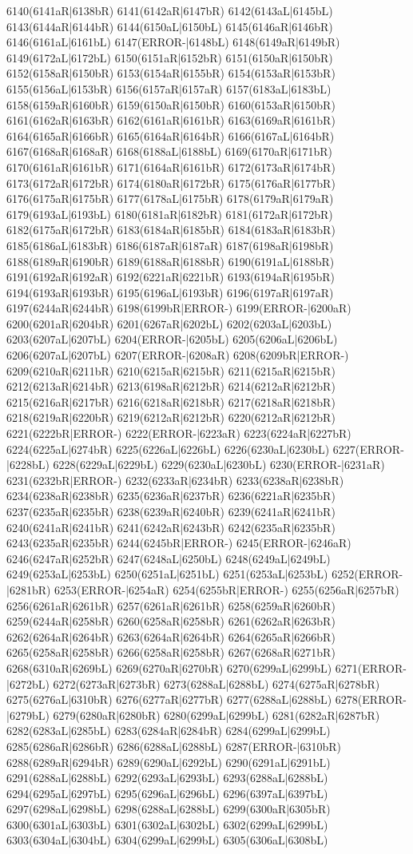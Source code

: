 6140(6141aR|6138bR) 6141(6142aR|6147bR) 6142(6143aL|6145bL) 6143(6144aR|6144bR) 6144(6150aL|6150bL) 6145(6146aR|6146bR) 6146(6161aL|6161bL) 6147(ERROR-|6148bL) 6148(6149aR|6149bR) 6149(6172aL|6172bL) 6150(6151aR|6152bR) 6151(6150aR|6150bR) 6152(6158aR|6150bR) 6153(6154aR|6155bR) 6154(6153aR|6153bR) 6155(6156aL|6153bR) 6156(6157aR|6157aR) 6157(6183aL|6183bL) 6158(6159aR|6160bR) 6159(6150aR|6150bR) 6160(6153aR|6150bR) 6161(6162aR|6163bR) 6162(6161aR|6161bR) 6163(6169aR|6161bR) 6164(6165aR|6166bR) 6165(6164aR|6164bR) 6166(6167aL|6164bR) 6167(6168aR|6168aR) 6168(6188aL|6188bL) 6169(6170aR|6171bR) 6170(6161aR|6161bR) 6171(6164aR|6161bR) 6172(6173aR|6174bR) 6173(6172aR|6172bR) 6174(6180aR|6172bR) 6175(6176aR|6177bR) 6176(6175aR|6175bR) 6177(6178aL|6175bR) 6178(6179aR|6179aR) 6179(6193aL|6193bL) 6180(6181aR|6182bR) 6181(6172aR|6172bR) 6182(6175aR|6172bR) 6183(6184aR|6185bR) 6184(6183aR|6183bR) 6185(6186aL|6183bR) 6186(6187aR|6187aR) 6187(6198aR|6198bR) 6188(6189aR|6190bR) 6189(6188aR|6188bR) 6190(6191aL|6188bR) 6191(6192aR|6192aR) 6192(6221aR|6221bR) 6193(6194aR|6195bR) 6194(6193aR|6193bR) 6195(6196aL|6193bR) 6196(6197aR|6197aR) 6197(6244aR|6244bR) 6198(6199bR|ERROR-) 6199(ERROR-|6200aR) 6200(6201aR|6204bR) 6201(6267aR|6202bL) 6202(6203aL|6203bL) 6203(6207aL|6207bL) 6204(ERROR-|6205bL) 6205(6206aL|6206bL) 6206(6207aL|6207bL) 6207(ERROR-|6208aR) 6208(6209bR|ERROR-) 6209(6210aR|6211bR) 6210(6215aR|6215bR) 6211(6215aR|6215bR) 6212(6213aR|6214bR) 6213(6198aR|6212bR) 6214(6212aR|6212bR) 6215(6216aR|6217bR) 6216(6218aR|6218bR) 6217(6218aR|6218bR) 6218(6219aR|6220bR) 6219(6212aR|6212bR) 6220(6212aR|6212bR) 6221(6222bR|ERROR-) 6222(ERROR-|6223aR) 6223(6224aR|6227bR) 6224(6225aL|6274bR) 6225(6226aL|6226bL) 6226(6230aL|6230bL) 6227(ERROR-|6228bL) 6228(6229aL|6229bL) 6229(6230aL|6230bL) 6230(ERROR-|6231aR) 6231(6232bR|ERROR-) 6232(6233aR|6234bR) 6233(6238aR|6238bR) 6234(6238aR|6238bR) 6235(6236aR|6237bR) 6236(6221aR|6235bR) 6237(6235aR|6235bR) 6238(6239aR|6240bR) 6239(6241aR|6241bR) 6240(6241aR|6241bR) 6241(6242aR|6243bR) 6242(6235aR|6235bR) 6243(6235aR|6235bR) 6244(6245bR|ERROR-) 6245(ERROR-|6246aR) 6246(6247aR|6252bR) 6247(6248aL|6250bL) 6248(6249aL|6249bL) 6249(6253aL|6253bL) 6250(6251aL|6251bL) 6251(6253aL|6253bL) 6252(ERROR-|6281bR) 6253(ERROR-|6254aR) 6254(6255bR|ERROR-) 6255(6256aR|6257bR) 6256(6261aR|6261bR) 6257(6261aR|6261bR) 6258(6259aR|6260bR) 6259(6244aR|6258bR) 6260(6258aR|6258bR) 6261(6262aR|6263bR) 6262(6264aR|6264bR) 6263(6264aR|6264bR) 6264(6265aR|6266bR) 6265(6258aR|6258bR) 6266(6258aR|6258bR) 6267(6268aR|6271bR) 6268(6310aR|6269bL) 6269(6270aR|6270bR) 6270(6299aL|6299bL) 6271(ERROR-|6272bL) 6272(6273aR|6273bR) 6273(6288aL|6288bL) 6274(6275aR|6278bR) 6275(6276aL|6310bR) 6276(6277aR|6277bR) 6277(6288aL|6288bL) 6278(ERROR-|6279bL) 6279(6280aR|6280bR) 6280(6299aL|6299bL) 6281(6282aR|6287bR) 6282(6283aL|6285bL) 6283(6284aR|6284bR) 6284(6299aL|6299bL) 6285(6286aR|6286bR) 6286(6288aL|6288bL) 6287(ERROR-|6310bR) 6288(6289aR|6294bR) 6289(6290aL|6292bL) 6290(6291aL|6291bL) 6291(6288aL|6288bL) 6292(6293aL|6293bL) 6293(6288aL|6288bL) 6294(6295aL|6297bL) 6295(6296aL|6296bL) 6296(6397aL|6397bL) 6297(6298aL|6298bL) 6298(6288aL|6288bL) 6299(6300aR|6305bR) 6300(6301aL|6303bL) 6301(6302aL|6302bL) 6302(6299aL|6299bL) 6303(6304aL|6304bL) 6304(6299aL|6299bL) 6305(6306aL|6308bL) 